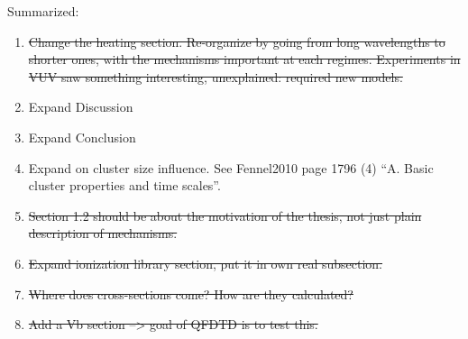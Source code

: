 Summarized:
\begin{enumerate}
\item \sout{Change the heating section. Re-organize by going from long wavelengths to
      shorter ones, with the mechanisms important at each regimes. Experiments
      in VUV saw something interesting, unexplained: required new models.}
\item Expand Discussion
\item Expand Conclusion
\item Expand on cluster size influence. See Fennel2010\cite{Fennel2010} page 1796 (4)
      ``A. Basic cluster properties and time scales''.
\item \sout{Section 1.2 should be about the motivation of the thesis, not just plain
      description of mechanisms.}
\item \sout{Expand ionization library section, put it in own real subsection.}
\item \sout{Where does cross-sections come? How are they calculated?}
\item \sout{Add a Vb section --> goal of QFDTD is to test this.}
\end{enumerate}


\newpage
{}
{}
\listoffixmes
